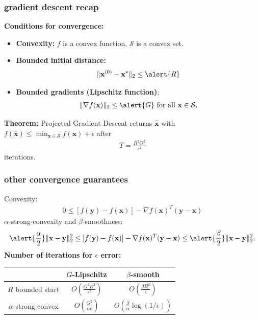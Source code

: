 \documentclass[compress]{beamer}
\newcommand{\bv}[1]{\mathbf{#1}}
\begin{document}
\begin{frame}[t]
	\frametitle{gradient descent recap}
	\textbf{Conditions for convergence:}
	\begin{itemize}
		\item \textbf{Convexity:} $f$ is a convex function, $\mathcal{S}$ is a convex set. 
		\item \textbf{Bounded initial distance:} 
		\begin{align*}
			\|\bv{x}^{(0)} - \bv{x}^*\|_2 \leq \alert{R}
		\end{align*}
		\item \textbf{Bounded gradients (Lipschitz function)}: 
		\begin{align*}
			\|\nabla f(\bv{x})\|_2 \leq \alert{G} \text{ for all } \bv{x}\in \mathcal{S}.
		\end{align*}
	\end{itemize}

\textbf{Theorem:} Projected Gradient Descent returns $\hat{\bv{x}}$ with $f(\hat{\bv{x}}) \leq \min_{\bv{x}\in \mathcal{S}}f(\bv{x})+\epsilon$ after
\begin{align*}
	T = \frac{R^2G^2}{\epsilon^2}
\end{align*}
iterations. 
\end{frame}

\begin{frame}[t]
	\frametitle{other convergence guarantees}
	Convexity: 
	\begin{align*}
		0 \leq \left[f(\bv{y}) - f(\bv{x})\right] - \nabla f(\bv{x})^T(\bv{y} - \bv{x})
	\end{align*}
$\alpha$-strong-convexity and $\beta$-smoothness:
	\begin{align*}
		\alert{\frac{\alpha}{2}}\|\bv{x} - \bv{y}\|_2^2 \leq\left[f(\bv{y}) - f(\bv{x})\right] - \nabla f(\bv{x})^T(\bv{y} - \bv{x}) \leq \alert{\frac{\beta}{2}}\|\bv{x} - \bv{y}\|_2^2.
	\end{align*}
	\textbf{Number of iterations for $\epsilon$ error:}
\begin{center}
	\begin{tabular}{c|cc}
		& $G$-Lipschitz & $\beta$-smooth   \\ \hline
		$R$ bounded start & $O\left(\frac{G^2R^2}{\epsilon^2}\right)$ & $O\left(\frac{\beta R^2}{\epsilon}\right)$ \\
		$\alpha$-strong convex & $O\left(\frac{G^2}{\alpha\epsilon}\right)$ & $O\left(\frac{\beta}{\alpha}\log(1/\epsilon)\right)$
	\end{tabular}
\end{center}

\end{frame}
\end{document}
